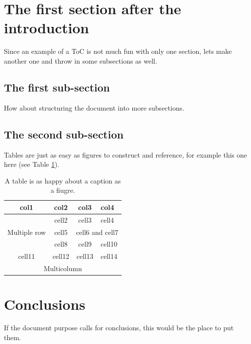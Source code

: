 \documentclass{cernatlasnote}
\begin{document}
\section{The first section after the introduction}
Since an example of a ToC is not much fun with only one section, lets make another one and throw in some subsections as well.


\subsection{The first sub-section}
How about structuring the document into more subsections.

\subsection{The second sub-section}
Tables are just as easy as figures to construct and reference, for example this one here (see Table \ref{tab:exampletable}).

\begin{table}[h]
\begin{center}
\begin{tabular}{ |c|c|c|p{}| } 
    \hline
    \rowcolor{lightgray} 
    col1 & col2 & col3 & col4\\
    \hline
    \multirow{3}{4em}{Multiple row} & cell2 & cell3 & cell4 \\ 
    \cline{3-4}
    & cell5 & \multicolumn{2}{c|}{cell6 and cell7} \\
    \cline{3-4}
    & cell8 & cell9 & cell10 \\ 
    \hline
    cell11 & cell12 & cell13 & cell14 \\ 
    \hline
    \multicolumn{4}{|c|}{ Multicolumn} \\
    \hline
\end{tabular}
\end{center}
\caption{A table is as happy about a caption as a fiugre.}
\label{tab:exampletable}
\end{table}

\section{Conclusions}
If the document purpose calls for conclusions, this would be the place to put them.



\end{document}
